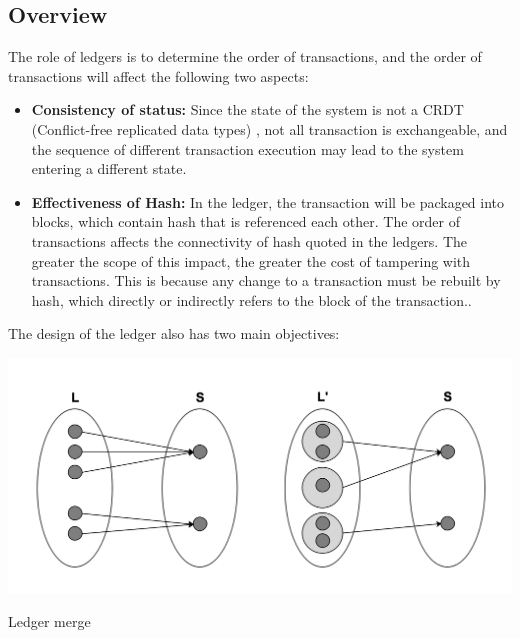 \documentclass[UTF8,nofonts]{article}
\makeatletter
\newenvironment{figurehere}
 {\def\@captype{figure}}
 {}
\makeatother
\begin{document}
\begin{multicols}{2}
\subsection{Overview}
The role of ledgers is to determine the order of transactions, and the order of transactions will affect the following two aspects:
\begin{itemize}
	\item \textbf{Consistency of status:} Since the state of the system is not a CRDT (Conflict-free replicated data types) \cite{crdt}, not all transaction is exchangeable, and the sequence of different transaction execution may lead to the system entering a different state.
	\item \textbf{Effectiveness of Hash:} In the ledger, the transaction will be packaged into blocks, which contain hash that is referenced each other. The order of transactions affects the connectivity of hash quoted in the ledgers. The greater the scope of this impact, the greater the cost of tampering with transactions. This is because any change to a transaction must be rebuilt by hash, which directly or indirectly refers to the block of the transaction..
\end{itemize}

The design of the ledger also has two main objectives:

\begin{center}
\begin{figurehere}
\includegraphics[width=.7\linewidth]{image/ledger-merge.png}
\caption{Ledger merge}
\end{figurehere}
\end{center}


\end{multicols}
\end{document}
